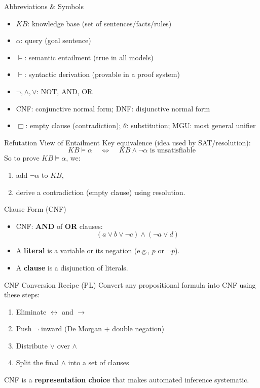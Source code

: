 \documentclass[aspectratio=169]{beamer}
\begin{document}
\begin{frame}{Abbreviations \& Symbols}
  \begin{itemize}[<+->]
    \item $KB$: knowledge base (set of sentences/facts/rules)
    \item $\alpha$: query (goal sentence)
    \item $\models$: semantic entailment (true in all models)
    \item $\vdash$: syntactic derivation (provable in a proof system)
    \item $\lnot,\land,\lor$: NOT, AND, OR
    \item CNF: conjunctive normal form; DNF: disjunctive normal form
    \item $\Box$: empty clause (contradiction); $\theta$: substitution; MGU: most general unifier
  \end{itemize}
\end{frame}

\begin{frame}{Refutation View of Entailment}
  Key equivalence (idea used by SAT/resolution):
  \[
    KB \models \alpha \;\;\;\; \Leftrightarrow \;\;\;\; KB \land \lnot \alpha \text{ is unsatisfiable}
  \]
  \vspace{0.4em}
  So to prove $KB \models \alpha$, we:
  \begin{enumerate}
    \item add $\lnot \alpha$ to $KB$,
    \item derive a contradiction (empty clause) using resolution.
  \end{enumerate}
\end{frame}

\begin{frame}{Clause Form (CNF)}
  \begin{itemize}[<+->]
    \item CNF: \textbf{AND} of \textbf{OR} clauses:
    \[
      (a \lor b \lor \lnot c) \land (\lnot a \lor d)
    \]
    \item A \textbf{literal} is a variable or its negation (e.g., $p$ or $\lnot p$).
    \item A \textbf{clause} is a disjunction of literals.
  \end{itemize}
\end{frame}

\begin{frame}{CNF Conversion Recipe (PL)}
  Convert any propositional formula into CNF using these steps:
  \begin{enumerate}[<+->]
    \item Eliminate $\leftrightarrow$ and $\rightarrow$
    \item Push $\lnot$ inward (De Morgan + double negation)
    \item Distribute $\lor$ over $\land$
    \item Split the final $\land$ into a set of clauses
  \end{enumerate}
  \vspace{0.3em}
  \small CNF is a \textbf{representation choice} that makes automated inference systematic.
\end{frame}
\end{document}
